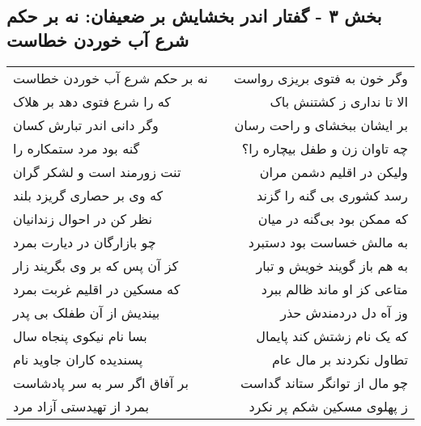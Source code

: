 \begin{center}
\section*{بخش ۳ - گفتار اندر بخشایش بر ضعیفان: نه بر حکم شرع آب خوردن خطاست}
\label{sec:003}
\begin{longtable}{l p{0.5cm} r}
نه بر حکم شرع آب خوردن خطاست
&&
وگر خون به فتوی بریزی رواست
\\
که را شرع فتوی دهد بر هلاک
&&
الا تا نداری ز کشتنش باک
\\
وگر دانی اندر تبارش کسان
&&
بر ایشان ببخشای و راحت رسان
\\
گنه بود مرد ستمکاره را
&&
چه تاوان زن و طفل بیچاره را؟
\\
تنت زورمند است و لشکر گران
&&
ولیکن در اقلیم دشمن مران
\\
که وی بر حصاری گریزد بلند
&&
رسد کشوری بی گنه را گزند
\\
نظر کن در احوال زندانیان
&&
که ممکن بود بی‌گنه در میان
\\
چو بازارگان در دیارت بمرد
&&
به مالش خساست بود دستبرد
\\
کز آن پس که بر وی بگریند زار
&&
به هم باز گویند خویش و تبار
\\
که مسکین در اقلیم غربت بمرد
&&
متاعی کز او ماند ظالم ببرد
\\
بیندیش از آن طفلک بی پدر
&&
وز آه دل دردمندش حذر
\\
بسا نام نیکوی پنجاه سال
&&
که یک نام زشتش کند پایمال
\\
پسندیده کاران جاوید نام
&&
تطاول نکردند بر مال عام
\\
بر آفاق اگر سر به سر پادشاست
&&
چو مال از توانگر ستاند گداست
\\
بمرد از تهیدستی آزاد مرد
&&
ز پهلوی مسکین شکم پر نکرد
\\
\end{longtable}
\end{center}
